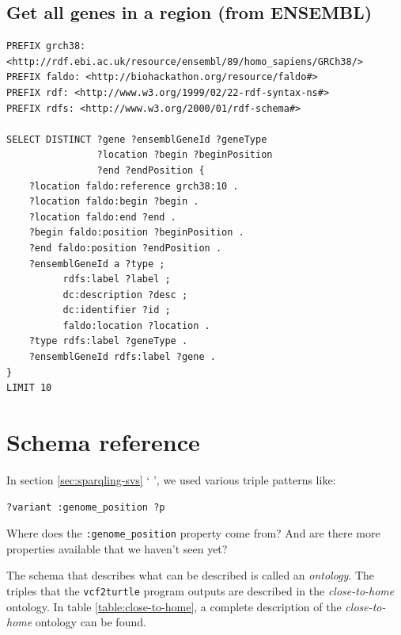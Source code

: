 \documentclass[11pt,a4paper,oneside]{book}
\begin{document}
\subsection{Get all genes in a region (from ENSEMBL)}
\begin{siderules}
\begin{verbatim}
PREFIX grch38: <http://rdf.ebi.ac.uk/resource/ensembl/89/homo_sapiens/GRCh38/>
PREFIX faldo: <http://biohackathon.org/resource/faldo#>
PREFIX rdf: <http://www.w3.org/1999/02/22-rdf-syntax-ns#>
PREFIX rdfs: <http://www.w3.org/2000/01/rdf-schema#>

SELECT DISTINCT ?gene ?ensemblGeneId ?geneType 
                ?location ?begin ?beginPosition 
                ?end ?endPosition {
    ?location faldo:reference grch38:10 .
    ?location faldo:begin ?begin .
    ?location faldo:end ?end .
    ?begin faldo:position ?beginPosition .
    ?end faldo:position ?endPosition .
    ?ensemblGeneId a ?type ;
          rdfs:label ?label ;
          dc:description ?desc ;
          dc:identifier ?id ;
          faldo:location ?location .
    ?type rdfs:label ?geneType .
    ?ensemblGeneId rdfs:label ?gene .
}
LIMIT 10
\end{verbatim}
\end{siderules}



\section{Schema reference}

  In section \ref{sec:sparqling-svs} {\color{LinkGray}`%
  '}, we used various triple patterns like:

\begin{siderules}
\begin{verbatim}
?variant :genome_position ?p
\end{verbatim}
\end{siderules}

  Where does the \texttt{:genome\_position} property come from?  And are
  there more properties available that we haven't seen yet?

  The schema that describes what can be described is called an \emph{ontology}.
  The triples that the \texttt{vcf2turtle} program outputs are described in
  the \emph{close-to-home} ontology.  In table \ref{table:close-to-home}, a
  complete description of the \emph{close-to-home} ontology can be found.
\end{document}
